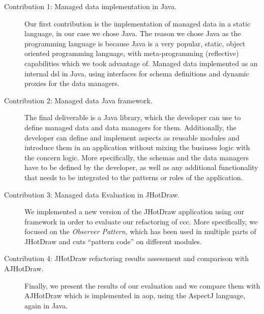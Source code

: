 \begin{description}
  \item[Contribution 1: Managed data implementation in Java.]
  Our first contribution is the implementation of managed data in a static language, in our case we chose Java.
  The reason we chose Java as the programming language is because Java is a very popular, static, object oriented programming language, with meta-programming (reflective) capabilities which we took advantage of.
  Managed data implemented as an internal \ac{dsl} in Java, using interfaces for schema definitions and dynamic proxies
  for the data managers.

  \item[Contribution 2: Managed data Java framework.]
  The final deliverable is a Java library, which the developer can use to define managed data and data managers for them. 
  Additionally, the developer can define and implement aspects as reusable modules and introduce them in an application without mixing the business logic with the concern logic. 
  More specifically, the schemas and the data managers have to be defined by the developer, as well as any additional functionality that needs to be integrated to the patterns or roles of the application.

  \item[Contribution 3: Managed data Evaluation in JHotDraw.]
  We implemented a new version of the JHotDraw application using our framework in order to evaluate our refactoring of \ac{ccc}.
  More specifically, we focused on the \textit{Observer Pattern}, which has been used in multiple parts of JHotDraw and cuts ``pattern code'' on different modules.

  \item[Contribution 4: JHotDraw refactoring results assessment and comparison with AJHotDraw.]
  Finally, we present the results of our evaluation and we compare them with AJHotDraw which is implemented in \ac{aop}, using the AspectJ language, again in Java.

\end{description}

